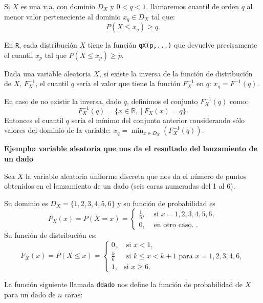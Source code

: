 \documentclass[]{book}
\newenvironment{Shaded}{\begin{snugshade}}{\end{snugshade}}
\newcommand{\ControlFlowTok}[1]{\textcolor[rgb]{0.13,0.29,0.53}{\textbf{#1}}}
\newcommand{\DataTypeTok}[1]{\textcolor[rgb]{0.13,0.29,0.53}{#1}}
\newcommand{\DecValTok}[1]{\textcolor[rgb]{0.00,0.00,0.81}{#1}}
\newcommand{\KeywordTok}[1]{\textcolor[rgb]{0.13,0.29,0.53}{\textbf{#1}}}
\newcommand{\NormalTok}[1]{#1}
\newcommand{\OperatorTok}[1]{\textcolor[rgb]{0.81,0.36,0.00}{\textbf{#1}}}
\newcommand{\StringTok}[1]{\textcolor[rgb]{0.31,0.60,0.02}{#1}}
\begin{document}
Si \(X\) es una v.a. con dominio \(D_X\) y \(0<q<1\), llamaremos cuantil de orden \(q\) al menor valor perteneciente al dominio \(x_q\in D_X\) tal que:
\[P(X\leq x_q)\geq q.\]

En \texttt{R}, cada distribución \(X\) tiene la función \texttt{qX(p,...)} que devuelve precisamente el cuantil \(x_p\) tal que \(P(X\leq x_p)\geq p.\)

Dada una variable aleatoria \(X\), si existe la inversa de la función de distribución de \(X\), \(F_X^{-1}\), el cuantil \(q\) sería el valor que tiene la función \(F_X^{-1}\) en \(q\): \(x_q=F^{-1}(q)\).

En caso de no existir la inversa, dado \(q\), definimos el conjunto \(F_X^{-1}(q)\) como:
\[
F_X^{-1}(q) =\{x\in\mathbb{R},\ |\ F_X(x)=q\}.
\]
Entonces el cuantil \(q\) sería el mínimo del conjunto anterior considerando sólo valores del dominio de la variable: \(x_q =\min_{x\in D_X}(F_X^{-1}(q))\).

\textbf{Ejemplo: variable aleatoria que nos da el resultado del lanzamiento de un dado}

Sea \(X\) la variable aleatoria uniforme discreta que nos da el número de puntos obtenidos en el lanzamiento de un dado (seis caras numeradas del 1 al 6).

Su dominio es \(D_X=\{1,2,3,4,5,6\}\) y su función de probabilidad es
\[
P_X(x)=P(X=x)=
\left\{
\begin{array}{ll}
 \frac{1}{6}, & \mbox{ si } x=1,2,3,4,5,6, \\
0, & \mbox{ en otro caso. }.
\end{array}
\right.
\]
Su función de distribución es:
\[
F_X(x)= P(X\leq x)=
\left\{
\begin{array}{ll}
0, & \mbox{ si } x<1, \\
\frac{k}{6} & \mbox{ si } k\leq x< k+1 \mbox{ para } x= 1,2,3,4,6, \\
 1, & \mbox{si  } x \geq 6.
\end{array}
\right.
\]

La función siguiente llamada \texttt{ddado} nos define la función de probabilidad de \(X\) para un dado de \(n\) caras:

\begin{Shaded}
\end{Shaded}
\end{document}
